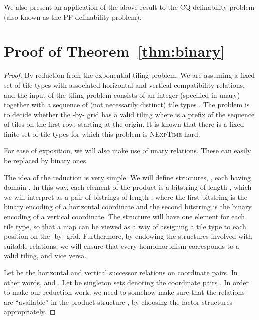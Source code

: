 \documentclass{article}
\newcommand{\nexptime}{\textsc{NExpTime}\xspace}
\begin{document}
We also present an application of the above result to the
CQ-definability problem (also known as the PP-definability problem).


\section{Proof of Theorem~\ref{thm:binary}}

\begin{proof}
    By reduction from the exponential tiling problem. We are assuming a fixed set of tile types with associated horizontal and vertical compatibility relations, and the input of the 
    tiling problem consists of an integer  (specified in unary) together with a 
  sequence of (not necessarily distinct) tile types . The problem is to
  decide whether the -by- grid has a valid tiling where 
   is a prefix of the sequence of tiles on the first row, starting at
   the origin.
  It is known that there is a fixed finite set of tile types for which
  this problem is \nexptime-hard.



  For ease of exposition, we will also make use of unary
  relations. These can easily be replaced by binary ones.

   The idea of the reduction is very simple.     We will define  structures, ,
   each having domain . In this way, each element of the product  is a bitstring of length , which we will interpret as a pair of bistrings of length , where the first bitstring is the binary encoding of a horizontal coordinate and the second bitstring is the binary encoding of a vertical coordinate. The structure  will have one element for each tile type, so that a map  can be viewed as a way of assigning a tile type to each position on the -by- grid. Furthermore, by endowing the structures involved with suitable relations, we will ensure that every homomorphism  corresponds to a valid tiling, and vice versa.

    Let  be the horizontal and vertical successor relations on coordinate
    pairs.
    In other words,  and .
 Let  be singleton sets denoting the coordinate pairs
    . In order to make our reduction work, we need to somehow make
sure that the relations  are ``available'' in the product structure , by choosing the factor structures  appropriately.


\end{proof}
\end{document}
